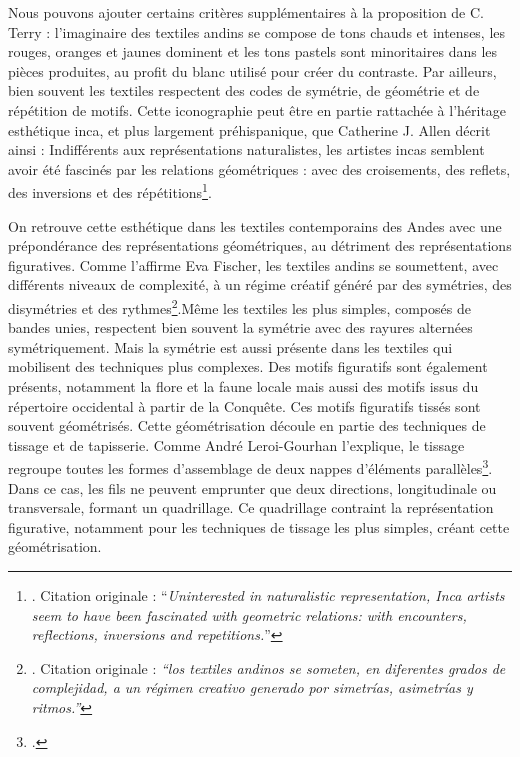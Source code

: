 Nous pouvons ajouter certains critères supplémentaires à la proposition de C. Terry : l'imaginaire des textiles andins se compose de tons chauds et intenses, les rouges, oranges et jaunes dominent et les tons pastels sont minoritaires dans les pièces produites, au profit du blanc utilisé pour créer du contraste. Par ailleurs, bien souvent les textiles respectent des codes de symétrie, de géométrie et de répétition de motifs. Cette iconographie peut être en partie rattachée à l'héritage esthétique inca, et plus largement préhispanique, que Catherine J. Allen décrit ainsi : \og Indifférents aux représentations naturalistes, les artistes incas semblent avoir été fascinés par les relations géométriques : avec des croisements, des reflets, des inversions et des répétitions\footnote{\cite[p.~19]{allenWhenUtensilsRevolt1998}. Citation originale : \textquotedblleft \textit{Uninterested in naturalistic representation, Inca artists seem to have been fascinated with geometric relations: with encounters, reflections, inversions and repetitions.}\textquotedblright}.\fg

On retrouve cette esthétique dans les textiles contemporains des Andes avec une prépondérance des représentations géométriques, au détriment des représentations figuratives. Comme l'affirme Eva Fischer, \og les textiles andins se soumettent, avec différents niveaux de complexité, à un régime créatif généré par des symétries, des disymétries et des rythmes\footnote{\cite[p.~226]{fischerUrdiendoTejidoSocial2008}. Citation originale : \textit{\textquotedblleft los textiles andinos se someten, en diferentes grados de complejidad, a un régimen creativo generado por simetrías, asimetrías y ritmos.\textquotedblright}}.\fg \:Même les textiles les plus simples, composés de bandes unies, respectent bien souvent la symétrie avec des rayures alternées symétriquement. Mais la symétrie est aussi présente dans les textiles qui mobilisent des techniques plus complexes. Des motifs figuratifs sont également présents, notamment la flore et la faune locale mais aussi des motifs issus du répertoire occidental à partir de la Conquête. Ces motifs figuratifs tissés sont souvent géométrisés. Cette géométrisation découle en partie des techniques de tissage et de tapisserie. Comme André Leroi-Gourhan l'explique, le tissage regroupe \og toutes les formes d'assemblage de deux nappes d'éléments parallèles\fg\footcite[p.~81]{leroi-gourhanHommeMatiereEvolution1943}. Dans ce cas, les fils ne peuvent emprunter que deux directions, longitudinale ou transversale, formant un quadrillage. Ce quadrillage contraint la représentation figurative, notamment pour les techniques de tissage les plus simples, créant cette géométrisation. 

